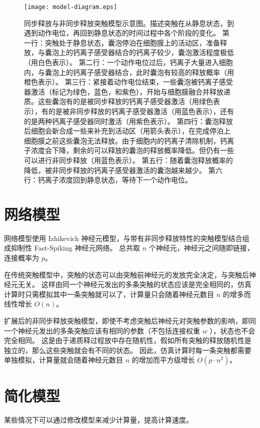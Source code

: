 \begin{figure}[h]
\centering
\texttt{[image: model-diagram.eps]}
\caption{同步释放与非同步释放突触模型示意图。描述突触在从静息状态，到遇到动作电位，再回到静息状态的时间过程中各个阶段的变化。
第一行：突触处于静息状态，囊泡停泊在细胞膜上的活动区，准备释放，与囊泡上的钙离子感受器结合的钙离子较少，囊泡激活程度极低（用白色表示）。
第二行：一个动作电位过后，钙离子大量进入细胞内，与囊泡上的钙离子感受器结合，此时囊泡有较高的释放概率（用橙色表示）。
第三行：紧接着动作电位结束，一些囊泡被钙离子感受器激活（标记为绿色，蓝色，和紫色），开始与细胞膜融合并释放递质。这些囊泡有的是被同步释放的钙离子感受器激活（用绿色表示），有的是被非同步释放的钙离子感受器激活（用蓝色表示），还有的是两种钙离子感受器同时激活（用紫色表示）。
第四行：囊泡释放后细胞会新合成一些来补充到活动区（用箭头表示），在完成停泊上细胞膜之前这些囊泡无法释放。由于细胞内的钙离子清除机制，钙离子浓度会下降，剩余的可以释放的囊泡的释放概率降低。但仍有一些可以进行非同步释放（用蓝色表示）。
第五行：随着囊泡释放概率的降低，被非同步释放的钙离子感受器激活的囊泡越来越少。
第六行：钙离子浓度回到静息状态，等待下一个动作电位。}
\label{figure:model-diagram}
\end{figure}

\section{网络模型}
\label{section:model:network-model}
网络模型使用 Izhikevich 神经元模型，与带有非同步释放特性的突触模型结合组成抑制性 Fast-Spiking 神经元网络。
总共取 $n$ 个神经元，神经元之间随即链接，连接概率为 $p$。

在传统突触模型中，突触的状态可以由突触前神经元的发放完全决定，与突触后神经元无关。
这样由同一个神经元发出的多条突触的状态应该是完全相同的，仿真计算时只需模拟其中一条突触就可以了，计算量只会随着神经元数目 $n$ 的增多而线性增长 $O(n)$。

扩展后的非同步释放突触模型，即使不考虑突触后神经元对突触参数的影响，即同一个神经元发出的多条突触应该有相同的参数（不包括连接权重 $w$ ），状态也不会完全相同。
这是由于递质释过程放中存在随机性，假如所有突触的释放随机性是独立的，那么这些突触就会有不同的状态。
因此，仿真计算时每一条突触都需要单独模拟，计算量就会随着神经元数目 $n$ 的增加而平方级增长 $O(p \cdot n^2)$。


\section{简化模型}
\label{section:model:simplified-model}
某些情况下可以通过修改模型来减少计算量，提高计算速度。

